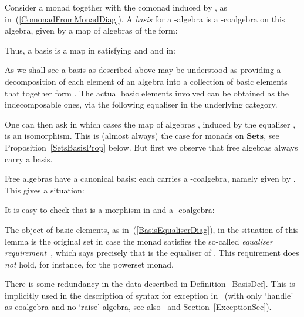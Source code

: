 \documentclass{LMCS}
\newif\ifignore \ignorefalse
\newcommand{\auxproof}[1]{
\ifignore\mbox{}\newline
\textbf{PROOF:} \dotfill\newline
{\it #1}\mbox{}\newline
\textbf{ENDPROOF}\dotfill
\fi}
\newenvironment{myproof}[1][Proof]{ \begin{trivlist}\item[\hskip \labelsep {\bfseries #1}]}{ \end{trivlist}}
\newcommand{\Cat}[1]{\ensuremath{\mathbf{#1}}}
\newcommand{\Sets}{\Cat{Sets}\xspace}
\begin{document}
\begin{defi}
\label{BasisDef}
Consider a monad  together with
the comonad  induced by ,
as in~(\ref{ComonadFromMonadDiag}). A \emph{basis} for a -algebra
 is a
-coalgebra on this algebra, given by a map of
algebras  of the form:


\noindent Thus, a basis  is a map  in
 satisfying  and  and  in:

\end{defi}


\noindent As we shall see a basis as described above may be understood as
providing a decomposition of each element  of an algebra into a
collection  of basic elements that together form .  The
actual basic elements  involved can be
obtained as the indecomposable ones, via the following equaliser in
the underlying category.


\noindent One can then ask in which cases the map of algebras
, induced by the equaliser , is an isomorphism. This is (almost
always) the case for monads on \Sets, see
Proposition~\ref{SetsBasisProp} below. But first we observe that free
algebras always carry a basis.



\begin{lem}
\label{FreeAlgCoalgLem}
Free algebras have a canonical basis: each 
carries a -coalgebra, namely given by . This
gives a situation:

\end{lem}


\begin{myproof}
It is easy to check that  is a morphism in  and
a -coalgebra:


\auxproof{

}
\end{myproof}



\noindent The object  of basic elements, as
in~(\ref{BasisEqualiserDiag}), in the situation of this lemma is the
original set  in case the monad  satisfies the so-called
\emph{equaliser requirement}~\cite{Moggi88}, which says precisely that
 is the equaliser of . This requirement does
\emph{not} hold, for instance, for the powerset monad.



There is some redundancy in the data described in
Definition~\ref{BasisDef}. This is implicitly used in the description
of syntax for exception in~\cite{SchroderM04} (with only `handle' as
coalgebra and no `raise' algebra, see also~\cite{Levy06} and
Section~\ref{ExceptionSec}).
\end{document}

